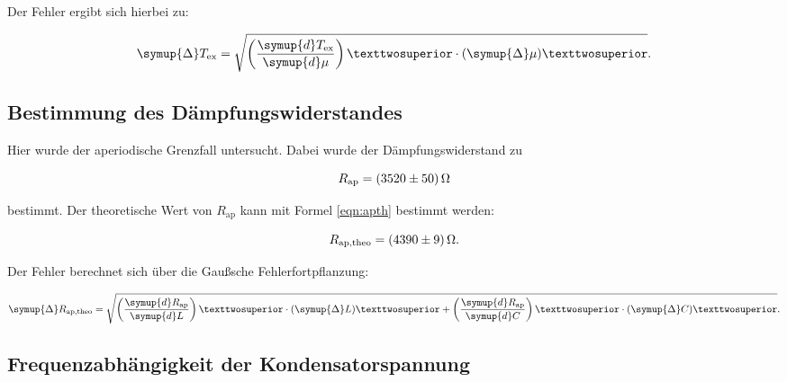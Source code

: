 Der Fehler ergibt sich hierbei zu: 

\begin{equation*}
\symup{\Delta} T_\text{ex} = \sqrt{\left(\frac{\symup{d}T_\text{ex}}{\symup{d}\mu}\right)²\cdot (\symup{\Delta}\mu)²}.
\end{equation*}

\subsection{Bestimmung des Dämpfungswiderstandes}

Hier wurde der aperiodische Grenzfall untersucht. Dabei wurde der
Dämpfungswiderstand zu 

\begin{equation*}
R_\text{ap} = \SI{3520+-50}{\ohm}
\end{equation*}

bestimmt.
Der theoretische Wert von $R_\text{ap}$ kann mit Formel \eqref{eqn:apth} bestimmt 
werden: 

\begin{equation*}
R_\text{ap,theo} = \SI{4390+-9}{\ohm}.
\end{equation*}

Der Fehler berechnet sich über die Gaußsche Fehlerfortpflanzung: 

\begin{equation*}
\symup{\Delta} R_\text{ap,theo} = \sqrt{\left(\frac{\symup{d}R_\text{ap}}{\symup{d}L}\right)²\cdot (\symup{\Delta}L)² +
\left(\frac{\symup{d}R_\text{ap}}{\symup{d}C}\right)²\cdot (\symup{\Delta}C)²}.
\end{equation*}

\subsection{Frequenzabhängigkeit der Kondensatorspannung}